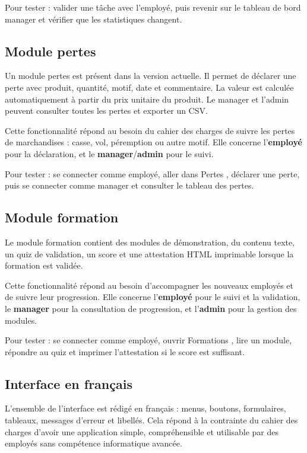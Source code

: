 \documentclass[11pt,a4paper]{article}
\newcommand{\role}[1]{\textbf{\color{oilgreen}#1}}
\begin{document}
Pour tester : valider une tâche avec l'employé, puis revenir sur le tableau de bord manager et vérifier que les statistiques changent.

\subsection{Module pertes}

Un module pertes est présent dans la version actuelle. Il permet de déclarer une perte avec produit, quantité, motif, date et commentaire. La valeur est calculée automatiquement à partir du prix unitaire du produit. Le manager et l'admin peuvent consulter toutes les pertes et exporter un CSV.

Cette fonctionnalité répond au besoin du cahier des charges de suivre les pertes de marchandises : casse, vol, péremption ou autre motif. Elle concerne l'\role{employé} pour la déclaration, et le \role{manager}/\role{admin} pour le suivi.

Pour tester : se connecter comme employé, aller dans \og Pertes \fg{}, déclarer une perte, puis se connecter comme manager et consulter le tableau des pertes.

\subsection{Module formation}

Le module formation contient des modules de démonstration, du contenu texte, un quiz de validation, un score et une attestation HTML imprimable lorsque la formation est validée.

Cette fonctionnalité répond au besoin d'accompagner les nouveaux employés et de suivre leur progression. Elle concerne l'\role{employé} pour le suivi et la validation, le \role{manager} pour la consultation de progression, et l'\role{admin} pour la gestion des modules.

Pour tester : se connecter comme employé, ouvrir \og Formations \fg{}, lire un module, répondre au quiz et imprimer l'attestation si le score est suffisant.

\subsection{Interface en français}

L'ensemble de l'interface est rédigé en français : menus, boutons, formulaires, tableaux, messages d'erreur et libellés. Cela répond à la contrainte du cahier des charges d'avoir une application simple, compréhensible et utilisable par des employés sans compétence informatique avancée.
\end{document}
